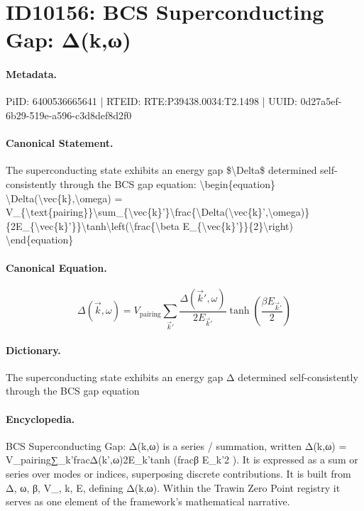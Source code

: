 \section*{ID10156: BCS Superconducting Gap: Δ(k,ω)}
\paragraph{Metadata.}
PiID: 6400536665641 | RTEID: RTE:P39438.0034:T2.1498 | UUID: 0d27a5ef-6b29-519e-a596-c3d8def8d2f0

\paragraph{Canonical Statement.}
The superconducting state exhibits an energy gap \$\textbackslash{}Delta\$ determined self-consistently through the BCS gap equation: \textbackslash{}begin\{equation\} \textbackslash{}Delta(\textbackslash{}vec\{k\},\textbackslash{}omega) = V\_\{\textbackslash{}text\{pairing\}\}\textbackslash{}sum\_\{\textbackslash{}vec\{k\}'\}\textbackslash{}frac\{\textbackslash{}Delta(\textbackslash{}vec\{k\}',\textbackslash{}omega)\}\{2E\_\{\textbackslash{}vec\{k\}'\}\}\textbackslash{}tanh\textbackslash{}left(\textbackslash{}frac\{\textbackslash{}beta E\_\{\textbackslash{}vec\{k\}'\}\}\{2\}\textbackslash{}right) \textbackslash{}end\{equation\}

\paragraph{Canonical Equation.}
\[
\Delta(\vec{k},\omega) = V_{\text{pairing}}\sum_{\vec{k}'}\frac{\Delta(\vec{k}',\omega)}{2E_{\vec{k}'}}\tanh\left(\frac{\beta E_{\vec{k}'}}{2}\right)
\]

\paragraph{Dictionary.}
The superconducting state exhibits an energy gap Δ determined self-consistently through the BCS gap equation

\paragraph{Encyclopedia.}
BCS Superconducting Gap: Δ(k,ω) is a series / summation, written Δ(k,ω) = V\_pairing∑\_k'fracΔ(k',ω)2E\_k'tanh (fracβ E\_k'2 ). It is expressed as a sum or series over modes or indices, superposing discrete contributions. It is built from Δ, ω, β, V\_, k, E, defining Δ(k,ω). Within the Trawin Zero Point registry it serves as one element of the framework's mathematical narrative.
